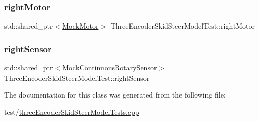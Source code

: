 \mbox{\label{classThreeEncoderSkidSteerModelTest_a15e3686caca6777c3ff4a9592a6c659b}} 
\subsubsection{\texorpdfstring{rightMotor}{rightMotor}}
{\footnotesize\ttfamily std\+::shared\+\_\+ptr$<$\mbox{\hyperlink{classokapi_1_1MockMotor}{Mock\+Motor}}$>$ Three\+Encoder\+Skid\+Steer\+Model\+Test\+::right\+Motor\hspace{0.3cm}{\ttfamily [protected]}}

\mbox{\label{classThreeEncoderSkidSteerModelTest_a5768a2d7bc5bc6896dc466f4da108b55}} 
\subsubsection{\texorpdfstring{rightSensor}{rightSensor}}
{\footnotesize\ttfamily std\+::shared\+\_\+ptr$<$\mbox{\hyperlink{classokapi_1_1MockContinuousRotarySensor}{Mock\+Continuous\+Rotary\+Sensor}}$>$ Three\+Encoder\+Skid\+Steer\+Model\+Test\+::right\+Sensor\hspace{0.3cm}{\ttfamily [protected]}}



The documentation for this class was generated from the following file\+:\begin{DoxyCompactItemize}
\item 
test/\mbox{\hyperlink{threeEncoderSkidSteerModelTests_8cpp}{three\+Encoder\+Skid\+Steer\+Model\+Tests.\+cpp}}\end{DoxyCompactItemize}
